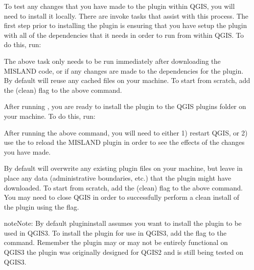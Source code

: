 \documentclass[letterpaper,10pt,english]{sphinxmanual}
\begin{document}
\sphinxAtStartPar
To test any changes that you have made to the plugin within QGIS, you will need
to install it locally. There are invoke tasks that assist with this process.
The first step prior to installing the plugin is ensuring that you have setup
the plugin with all of the dependencies that it needs in order to run from
within QGIS. To do this, run:

\begin{sphinxVerbatim}[commandchars=\\\{\}]
 
\end{sphinxVerbatim}

\sphinxAtStartPar
The above task only needs to be run immediately after downloading the
MISLAND code, or if any changes are made to the dependencies for the
plugin. By default  will re\sphinxhyphen{}use any cached files on your
machine. To start from scratch, add the  (clean) flag to the above
command.

\sphinxAtStartPar
After running , you are ready to install the plugin to the QGIS
plugins folder on your machine. To do this, run:

\begin{sphinxVerbatim}[commandchars=\\\{\}]
 
\end{sphinxVerbatim}

\sphinxAtStartPar
After running the above command, you will need to either 1) restart QGIS, or 2)
use the 
to reload the MISLAND plugin in order to see the effects of the changes
you have made.

\sphinxAtStartPar
By default  will overwrite any existing plugin files on your
machine, but leave in place any data (administrative boundaries, etc.) that the
plugin might have downloaded. To start from scratch, add the  (clean)
flag to the above command. You may need to close QGIS in order to successfully
perform a clean install of the plugin using the  flag.

\begin{sphinxadmonition}{note}{Note:}
\sphinxAtStartPar
By default plugin\sphinxhyphen{}install assumes you want to install the plugin to be used
in QGIS3. To install the plugin for use in QGIS3, add the flag  to
the  command. Remember the plugin may or may not be
entirely functional on QGIS3 \sphinxhyphen{} the plugin was originally designed for QGIS2
and is still being tested on QGIS3.
\end{sphinxadmonition}
\end{document}
